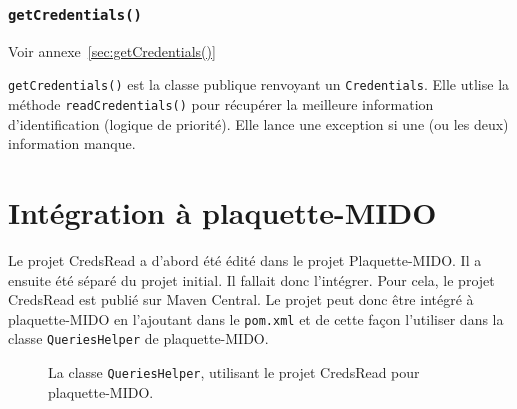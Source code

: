 \subsubsection{\texttt{getCredentials()}}
Voir annexe~\ref{sec:getCredentials()}

\texttt{getCredentials()} est la classe publique renvoyant un \texttt{Credentials}. Elle utlise la méthode \texttt{readCredentials()} pour récupérer la meilleure information d'identification (logique de priorité). Elle lance une exception si une (ou les deux) information manque.

\section{Intégration à plaquette-MIDO}

Le projet CredsRead a d'abord été édité dans le projet Plaquette-MIDO. Il a ensuite été séparé du projet initial. Il fallait donc l'intégrer. Pour cela, le projet CredsRead est publié sur Maven Central. Le projet peut donc être intégré à plaquette-MIDO en l'ajoutant dans le \texttt{pom.xml} et de cette façon l'utiliser dans la classe \texttt{QueriesHelper} de plaquette-MIDO.

\begin{figure}[!ht]
    
    \caption*{La classe \texttt{QueriesHelper}, utilisant le projet CredsRead pour plaquette-MIDO.}
\end{figure}